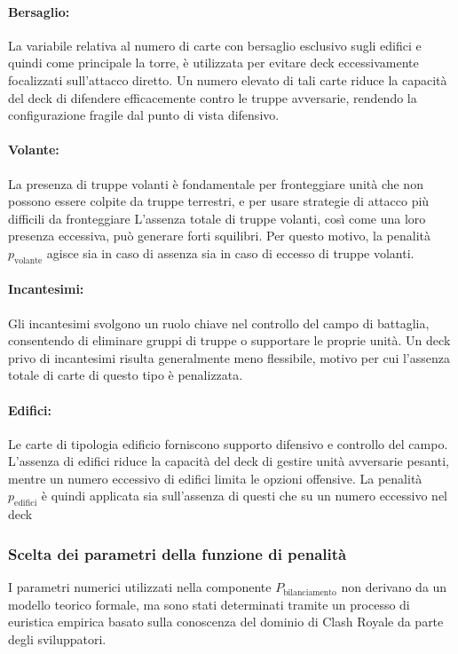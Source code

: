 \documentclass{article}
\begin{document}
\paragraph{Bersaglio:}
La variabile relativa al numero di carte con bersaglio esclusivo sugli edifici e quindi come principale la torre, è utilizzata per evitare deck eccessivamente focalizzati sull’attacco diretto. 
Un numero elevato di tali carte riduce la capacità del deck di difendere efficacemente contro le truppe avversarie, rendendo la configurazione fragile dal punto di vista difensivo.

\paragraph{Volante:}
La presenza di truppe volanti è fondamentale per fronteggiare unità che non possono essere colpite da truppe terrestri, e per usare strategie di attacco più difficili da fronteggiare
L’assenza totale di truppe volanti, così come una loro presenza eccessiva, può generare forti squilibri. 
Per questo motivo, la penalità $p_{\text{volante}}$ agisce sia in caso di assenza sia in caso di eccesso di truppe volanti.

\paragraph{Incantesimi:}
Gli incantesimi svolgono un ruolo chiave nel controllo del campo di battaglia, consentendo di eliminare gruppi di truppe o supportare le proprie unità. 
Un deck privo di incantesimi risulta generalmente meno flessibile, motivo per cui l’assenza totale di carte di questo tipo è penalizzata.

\paragraph{Edifici:}
Le carte di tipologia edificio forniscono supporto difensivo e controllo del campo. 
L’assenza di edifici riduce la capacità del deck di gestire unità avversarie pesanti, mentre un numero eccessivo di edifici limita le opzioni offensive. 
La penalità $p_{\text{edifici}}$ è quindi applicata sia sull'assenza di questi che su un numero eccessivo nel deck 

\subsubsection{Scelta dei parametri della funzione di penalità}

I parametri numerici utilizzati nella componente $P_{\text{bilanciamento}}$ non derivano da un modello teorico formale, ma sono stati determinati tramite un processo di euristica empirica basato sulla conoscenza del dominio di Clash Royale da parte degli sviluppatori.
\end{document}
